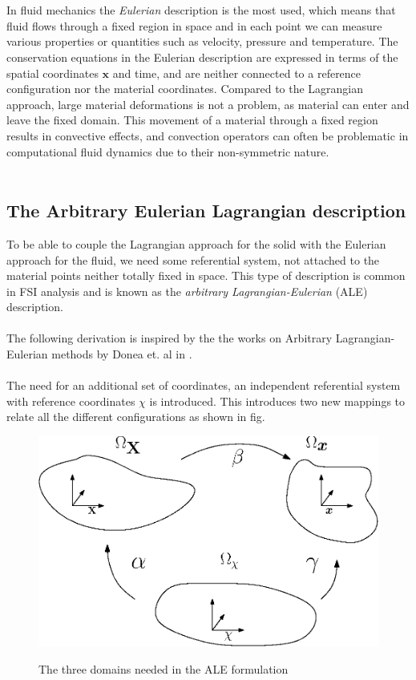 \\
\\
In fluid mechanics the \textit{Eulerian} description is the most used, which means that fluid flows through a fixed region in space and in each point we can measure various properties or quantities such as velocity, pressure and temperature. The conservation equations in the Eulerian description are expressed in terms of the spatial coordinates $\mathbf{x}$ and time, and are neither connected to a reference configuration nor the material coordinates. Compared to the Lagrangian approach, large material deformations is not a problem, as material can enter and leave the fixed domain. This movement of a material through a fixed region results in convective effects, and convection operators can often be problematic in computational fluid dynamics due to their non-symmetric nature. 
\\
\\
\subsection{The Arbitrary Eulerian Lagrangian description}
To be able to couple the Lagrangian approach for the solid with the Eulerian approach for the fluid, we need some referential system, not attached to the material points neither totally fixed in space. This type of description is common in FSI analysis and is known as the \textit{arbitrary Lagrangian-Eulerian} (ALE) description.
\\
\\The following derivation is inspired by the the works on Arbitrary Lagrangian-Eulerian methods by Donea et. al in \cite{Done04}. 
\\
\\
The need for an additional set of coordinates, an independent referential system with reference coordinates $\chi$ is introduced. This introduces two new mappings to relate all the different configurations as shown in fig. 
\begin{center}
\begin{figure}[!ht]
\includegraphics{figures/ALE_domain} \label{ALE_domain}
\caption{The three domains needed in the ALE formulation}
\end{figure}
\end{center}

